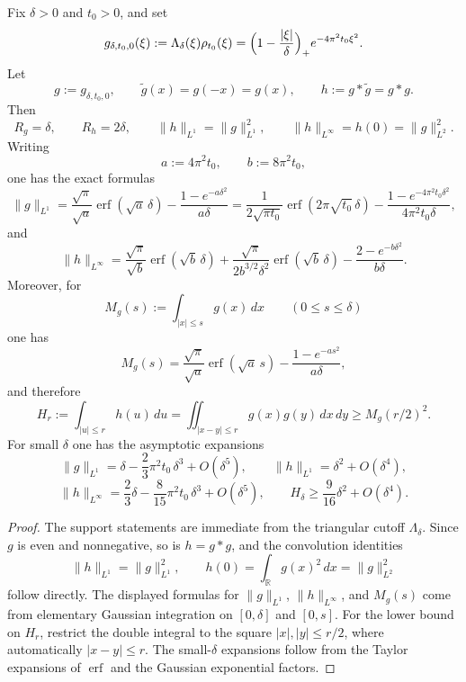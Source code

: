 \begin{proposition}\label{prop:canonical-half-atom-bounds}
Fix $\delta>0$ and $t_0>0$, and set
\[
  g_{\delta,t_0,0}(\xi)
  :=
  \Lambda_\delta(\xi)\rho_{t_0}(\xi)
  =
  \Bigl(1-\frac{|\xi|}{\delta}\Bigr)_+ e^{-4\pi^2 t_0 \xi^2}.
\]
Let
\[
  g:=g_{\delta,t_0,0},
  \qquad
  \widetilde g(x)=g(-x)=g(x),
  \qquad
  h:=g*\widetilde g=g*g.
\]
Then
\[
  R_g=\delta,
  \qquad
  R_h=2\delta,
  \qquad
  \|h\|_{L^1}=\|g\|_{L^1}^2,
  \qquad
  \|h\|_{L^\infty}=h(0)=\|g\|_{L^2}^2.
\]
Writing
\[
  a:=4\pi^2 t_0,
  \qquad
  b:=8\pi^2 t_0,
\]
one has the exact formulas
\[
  \|g\|_{L^1}
  =
  \frac{\sqrt{\pi}}{\sqrt a}\operatorname{erf}(\sqrt a\,\delta)
  -
  \frac{1-e^{-a\delta^2}}{a\delta}
  =
  \frac{1}{2\sqrt{\pi t_0}}\operatorname{erf}(2\pi\sqrt{t_0}\,\delta)
  -
  \frac{1-e^{-4\pi^2 t_0\delta^2}}{4\pi^2 t_0\delta},
\]
and
\[
  \|h\|_{L^\infty}
  =
  \frac{\sqrt{\pi}}{\sqrt b}\operatorname{erf}(\sqrt b\,\delta)
  +
  \frac{\sqrt{\pi}}{2b^{3/2}\delta^2}\operatorname{erf}(\sqrt b\,\delta)
  -
  \frac{2-e^{-b\delta^2}}{b\delta}.
\]
Moreover, for
\[
  M_g(s):=\int_{|x|\le s} g(x)\,dx
  \qquad (0\le s\le \delta)
\]
one has
\[
  M_g(s)
  =
  \frac{\sqrt\pi}{\sqrt a}\operatorname{erf}(\sqrt a\,s)
  -
  \frac{1-e^{-a s^2}}{a\delta},
\]
and therefore
\[
  H_r:=\int_{|u|\le r} h(u)\,du
  =
  \iint_{|x-y|\le r} g(x)g(y)\,dx\,dy
  \ge
  M_g(r/2)^2.
\]
For small $\delta$ one has the asymptotic expansions
\[
  \|g\|_{L^1}
  =
  \delta-\frac{2}{3}\pi^2 t_0\,\delta^3+O(\delta^5),
  \qquad
  \|h\|_{L^1}
  =
  \delta^2+O(\delta^4),
\]
\[
  \|h\|_{L^\infty}
  =
  \frac{2}{3}\delta-\frac{8}{15}\pi^2 t_0\,\delta^3+O(\delta^5),
  \qquad
  H_\delta\ge \frac{9}{16}\delta^2+O(\delta^4).
\]
\end{proposition}

\begin{proof}
The support statements are immediate from the triangular cutoff
$\Lambda_\delta$. Since $g$ is even and nonnegative, so is $h=g*g$, and the
convolution identities
\[
  \|h\|_{L^1}=\|g\|_{L^1}^2,
  \qquad
  h(0)=\int_{\mathbb R} g(x)^2\,dx=\|g\|_{L^2}^2
\]
follow directly. The displayed formulas for $\|g\|_{L^1}$,
$\|h\|_{L^\infty}$, and $M_g(s)$ come from elementary Gaussian integration on
$[0,\delta]$ and $[0,s]$. For the lower bound on $H_r$, restrict the double
integral to the square $|x|,|y|\le r/2$, where automatically $|x-y|\le r$. The
small-$\delta$ expansions follow from the Taylor expansions of
$\operatorname{erf}$ and the Gaussian exponential factors.
\end{proof}

